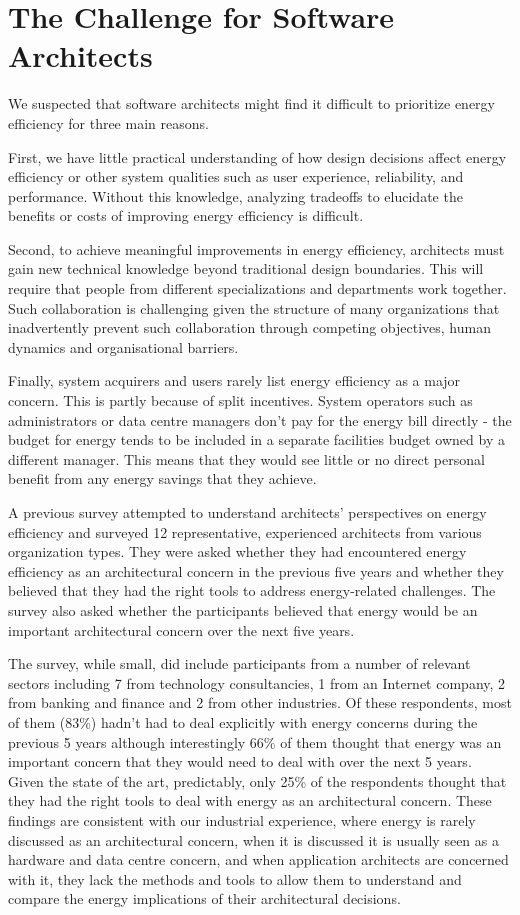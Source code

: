 \section{The Challenge for Software Architects}

We suspected that software architects might find it difficult to prioritize energy efficiency for three main reasons. 

First, we have little practical understanding of how design decisions affect energy efficiency or other system qualities such as user experience, reliability, and performance. Without this knowledge, analyzing tradeoffs to elucidate the benefits or costs of improving energy efficiency is difficult.

Second, to achieve meaningful improvements in energy efficiency, architects must gain new technical knowledge beyond traditional design boundaries. This will require that people from different specializations and departments work together. Such collaboration is challenging given the structure of many organizations that inadvertently prevent such collaboration through competing objectives, human dynamics and organisational barriers.

Finally, system acquirers and users rarely list energy efficiency as a major concern. This is partly because of split incentives. System operators such as administrators or data centre managers don't pay for the energy bill directly - the budget for energy tends to be included in a separate facilities budget owned by a different manager. This means that they would see little or no direct personal benefit from any energy savings that they achieve.

A previous survey attempted to understand architects' perspectives on energy efficiency \cite{bashroush2016-datacentreenergy} and surveyed 12 representative, experienced architects from various organization types. They were asked whether they had encountered energy efficiency as an architectural concern in the previous five years and whether they believed that they had the right tools to address energy-related challenges. The survey also asked whether the participants believed that energy would be an important architectural concern over the next five years.

The survey, while small, did include participants from a number of relevant sectors including 7 from technology consultancies, 1 from an Internet company, 2 from banking and finance and 2 from other industries.  Of these respondents, most of them (83\%) hadn't had to deal explicitly with energy concerns during the previous 5 years although interestingly 66\% of them thought that energy was an important concern that they would need to deal with over the next 5 years.  Given the state of the art, predictably, only 25\% of the respondents thought that they had the right tools to deal with energy as an architectural concern.  These findings are consistent with our industrial experience, where energy is rarely discussed as an architectural concern, when it is discussed it is usually seen as a hardware and data centre concern, and when application architects are concerned with it, they lack the methods and tools to allow them to understand and compare the energy implications of their architectural decisions.

